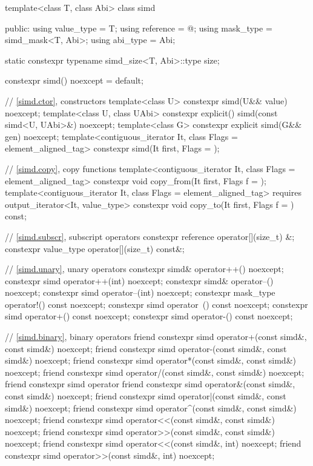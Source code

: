 \begin{codeblock}
template<class T, class Abi> class simd {
public:
  using value_type = T;
  using reference = @\seebelow@;
  using mask_type = simd_mask<T, Abi>;
  using abi_type = Abi;

  static constexpr typename simd_size<T, Abi>::type size;

  constexpr simd() noexcept = default;

  // \ref{simd.ctor},  constructors
  template<class U> constexpr simd(U&& value) noexcept;
  template<class U, class UAbi>
    constexpr explicit(\seebelow) simd(const simd<U, UAbi>&) noexcept;
  template<class G> constexpr explicit simd(G&& gen) noexcept;
  template<contiguous_iterator It, class Flags = element_aligned_tag>
    constexpr simd(It first, Flags = {});

  // \ref{simd.copy},  copy functions
  template<contiguous_iterator It, class Flags = element_aligned_tag>
    constexpr void copy_from(It first, Flags f = {});
  template<contiguous_iterator It, class Flags = element_aligned_tag>
    requires output_iterator<It, value_type>
    constexpr void copy_to(It first, Flags f = {}) const;

  // \ref{simd.subscr},  subscript operators
  constexpr reference operator[](size_t) &;
  constexpr value_type operator[](size_t) const&;

  // \ref{simd.unary},  unary operators
  constexpr simd& operator++() noexcept;
  constexpr simd operator++(int) noexcept;
  constexpr simd& operator--() noexcept;
  constexpr simd operator--(int) noexcept;
  constexpr mask_type operator!() const noexcept;
  constexpr simd operator~() const noexcept;
  constexpr simd operator+() const noexcept;
  constexpr simd operator-() const noexcept;

  // \ref{simd.binary},  binary operators
  friend constexpr simd operator+(const simd&, const simd&) noexcept;
  friend constexpr simd operator-(const simd&, const simd&) noexcept;
  friend constexpr simd operator*(const simd&, const simd&) noexcept;
  friend constexpr simd operator/(const simd&, const simd&) noexcept;
  friend constexpr simd operator%
  friend constexpr simd operator&(const simd&, const simd&) noexcept;
  friend constexpr simd operator|(const simd&, const simd&) noexcept;
  friend constexpr simd operator^(const simd&, const simd&) noexcept;
  friend constexpr simd operator<<(const simd&, const simd&) noexcept;
  friend constexpr simd operator>>(const simd&, const simd&) noexcept;
  friend constexpr simd operator<<(const simd&, int) noexcept;
  friend constexpr simd operator>>(const simd&, int) noexcept;

}
\end{codeblock}
